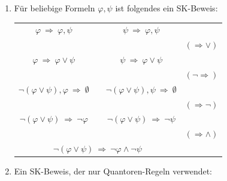 \documentclass[fontsize=11pt, twoside=false, numbers=autoenddot]{scrbook}
\begin{document}
\begin{enumerate}
  \item
    Für beliebige Formeln $\varphi,\psi$ ist folgendes ein SK-Beweis:
    \par\smallskip
    \begin{center}
      \begin{tabular}{cccl}
        $\varphi ~\Rightarrow~ \varphi,\psi$                       & \qquad & $\psi ~\Rightarrow~ \varphi,\psi$                       &                       \\[-6pt]
        \hrulefill                                                 &        & \hrulefill                                              & $(\Rightarrow \lor)$  \\[-2pt]
        $\varphi ~\Rightarrow~ \varphi \lor \psi$                  & \qquad & $\psi ~\Rightarrow~ \varphi \lor \psi$                  &                       \\[-6pt]
        \hrulefill                                                 &        & \hrulefill                                              & $(\lnot \Rightarrow)$ \\[-2pt]
        $\lnot(\varphi \lor \psi),\varphi ~\Rightarrow~ \emptyset$ & \qquad & $\lnot(\varphi \lor \psi),\psi ~\Rightarrow~ \emptyset$ &                       \\[-6pt]
        \hrulefill                                                 &        & \hrulefill                                              & $(\Rightarrow\lnot)$  \\[-2pt]
        $\lnot(\varphi \lor \psi) ~\Rightarrow~ \lnot\varphi$      & \qquad & $\lnot(\varphi \lor \psi) ~\Rightarrow~ \lnot\psi$      &                       \\[-6pt]
        \multicolumn{3}{c}{\hrulefill}                                                                                                & $(\Rightarrow\land)$  \\[-2pt]
        \multicolumn{3}{c}{$\lnot(\varphi \lor \psi) ~\Rightarrow~ \lnot\varphi \land \lnot\psi$}                                     &
      \end{tabular}
    \end{center}
    \par\medskip
  \item
    Ein SK-Beweis, der nur Quantoren-Regeln verwendet:
    \par\smallskip
    \begin{center}
      \begin{tabular}{cl}

\end{tabular}
\end{center}
\end{enumerate}
\end{document}
